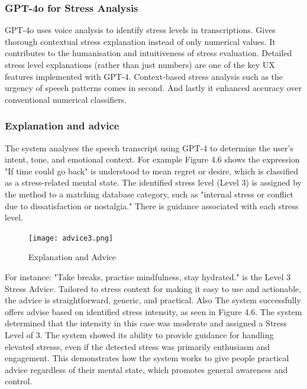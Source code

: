 \documentclass[Arial,12pt,openright,twoside]{book}
\begin{document}
   \subsubsection{GPT-4o for Stress Analysis}
    GPT-4o uses voice analysis to identify stress levels in transcriptions. Gives thorough contextual stress explanation instead of only numerical values. It contributes to the humanisation and intuitiveness of stress evaluation. Detailed stress level explanations (rather than just numbers) are one of the key UX features implemented with GPT-4. Context-based stress analysis such as the urgency of speech patterns comes in second. And lastly it enhanced accuracy over conventional numerical classifiers.
\subsubsection{Explanation and advice}
The system analyses the speech transcript using GPT-4 to determine the user's intent, tone, and emotional context. For example Figure 4.6 shows the expression "If time could go back" is understood to mean regret or desire, which is classified as a stress-related mental state. The identified stress level (Level 3) is assigned by the method to a matching database category, such as "internal stress or conflict due to dissatisfaction or nostalgia." There is guidance associated with each stress level. 
\begin{figure}[H]
    \centering
    \texttt{[image: advice3.png]}
    \caption{Explanation and Advice}
    \label{fig:advice1}
\end{figure} 
For instance: "Take breaks, practise mindfulness, stay hydrated." is the Level 3 Stress Advice. Tailored to stress context for making it easy to use and actionable, the advice is straightforward, generic, and practical. Also The system successfully offers advise based on identified stress intensity, as seen in Figure 4.6. The system determined that the intensity in this case was moderate and assigned a Stress Level of 3. The system showed its ability to provide guidance for handling elevated stresss, even if the detected stress was primarily enthusiasm and engagement. This demonstrates how the system works to give people practical advice regardless of their mental state, which promotes general awareness and control.  
\vspace{10pt} %
\end{document}
